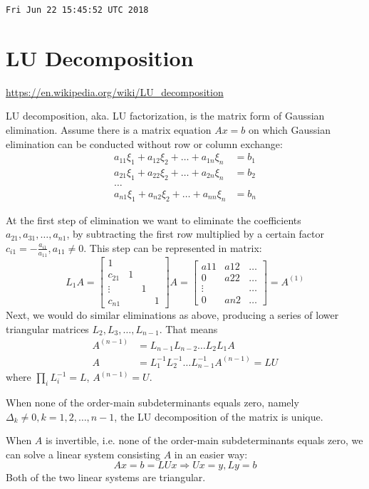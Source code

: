 \verb|Fri Jun 22 15:45:52 UTC 2018|

\section{LU Decomposition}
\url{https://en.wikipedia.org/wiki/LU_decomposition}

LU decomposition, aka. LU factorization, is the matrix form of Gaussian
elimination. Assume there is a matrix equation $Ax=b$ on which Gaussian
elimination can be conducted without row or column exchange:
\begin{align}
	a_{11}\xi_1 + a_{12}\xi_2 + \ldots + a_{1n}\xi_n &= b_1 \\
	a_{21}\xi_1 + a_{22}\xi_2 + \ldots + a_{2n}\xi_n &= b_2 \\
	\ldots \\
	a_{n1}\xi_1 + a_{n2}\xi_2 + \ldots + a_{nn}\xi_n &= b_n
\end{align}

At the first step of elimination we want to eliminate the coefficients
$a_{21}, a_{31}, \ldots, a_{n1}$, by subtracting the first row multiplied
by a certain factor $c_{i1} = -\frac{a_{i1}}{a_{11}}, a_{11}\ne 0$. This
step can be represented in matrix:
$$
L_1 A =
\begin{bmatrix}
	1 & & & \\
	c_{21} & 1 & & \\
	\vdots & & 1 & \\
	c_{n1} & & & 1
\end{bmatrix} A
=
\begin{bmatrix}
    a11 & a12 & \ldots \\
	0 & a22 & \ldots \\
	\vdots & & \ldots \\
	0 & an2 & \ldots
\end{bmatrix}
= A^{(1)}
$$
Next, we would do similar eliminations as above, producing a series of lower
triangular matrices $L_2, L_3, \ldots, L_{n-1}$. That means
\begin{align}
	A^{(n-1)} &= L_{n-1} L_{n-2} \ldots L_2 L_1 A \\
	A &= L_1^{-1} L_2^{-1} \ldots L_{n-1}^{-1} A^{(n-1)} = LU
\end{align}
where $\prod_i L_i^{-1} = L$, $A^{(n-1)} = U$.

When none of the order-main subdeterminants equals zero, namely
$\Delta_k \ne 0, k = 1, 2, \ldots, n-1$,
the LU decomposition of the matrix is unique.

When $A$ is invertible, i.e. none of the order-main subdeterminants equals
zero, we can solve a linear system consisting $A$ in an easier way:
$$
Ax=b=LUx \Rightarrow Ux=y, Ly=b
$$
Both of the two linear systems are triangular.

